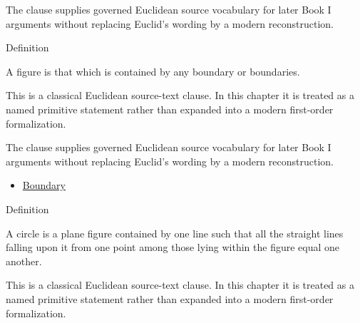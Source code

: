 \begin{remark*}[Interpretation]
The clause supplies governed Euclidean source vocabulary for later Book I
arguments without replacing Euclid's wording by a modern reconstruction.
\end{remark*}

\begin{lra-not-visible}
\DefinitionalRoot
\end{lra-not-visible}

\begin{definitionbox}{Definition}
\begin{definition}[Figure]
\label{def:euclid-figure}
A figure is that which is contained by any boundary or boundaries.
\end{definition}
\end{definitionbox}
\begin{remark*}
This is a classical Euclidean source-text clause. In this chapter it is treated
as a named primitive statement rather than expanded into a modern first-order
formalization.
\end{remark*}

\begin{remark*}[Interpretation]
The clause supplies governed Euclidean source vocabulary for later Book I
arguments without replacing Euclid's wording by a modern reconstruction.
\end{remark*}

\begin{lra-not-visible}
\begin{dependencies}
\begin{itemize}
  \item \hyperref[def:euclid-boundary]{Boundary}
\end{itemize}
\end{dependencies}
\end{lra-not-visible}

\begin{definitionbox}{Definition}
\begin{definition}[Circle]
\label{def:euclid-circle}
A circle is a plane figure contained by one line such that all the straight
lines falling upon it from one point among those lying within the figure equal
one another.
\end{definition}
\end{definitionbox}
\begin{remark*}
This is a classical Euclidean source-text clause. In this chapter it is treated
as a named primitive statement rather than expanded into a modern first-order
formalization.
\end{remark*}


